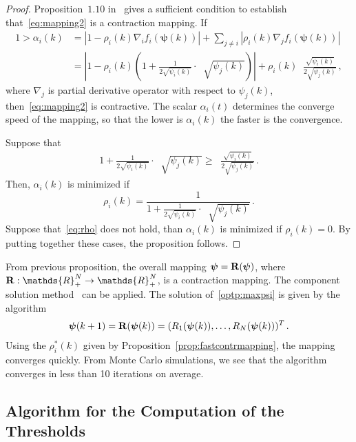 \documentclass[a4paper,notitlepage,onecolumn]{article}
\def\R{\mathds{R}}
\def\Rb{{\bf R}}
\def\Rb{{\bf R}}
\def\psib{\boldsymbol{\psi}}
\def\varphib{\boldsymbol{\varphi}}
\numberwithin{equation}{section}
\begin{document}
\begin{proof}
Proposition~$1.10$ in~\cite[Pag.193]{tsi} gives a sufficient
condition to establish that~\eqref{eq:mapping2} is a contraction
mapping. If
\begin{align*}
1 > \alpha_i(k)& =|1-\rho_i(k)\nabla_i f_i(\psib(k)) |+
\sum_{j\neq i} |
\rho_i(k) \nabla_j f_i(\psib(k))| \\
& = \left|1-\rho_i(k)\left(1 +  \frac{1}{2\sqrt{\psi_i(k)}} \cdot \mathop{\sum_{j\in \Theta_{\varphib_i}}}\sqrt{\psi_j(k)}\right) \right| + \rho_i(k)\mathop{\sum_{j\in \Theta_{\varphib_i}}}\frac{\sqrt{\psi_i(k)}}{2\sqrt{\psi_j(k)}}  \,,
\end{align*}
where $\nabla_j$ is partial derivative operator with respect to
$\psi_j(k)$, then~\eqref{eq:mapping2} is contractive. The scalar
$\alpha_i(t)$ determines the converge speed of the mapping, so
that the lower is $\alpha_i(k)$ the faster is the convergence.

Suppose that
\begin{align} \label{eq:rho}
1 +  \frac{1}{2\sqrt{\psi_i(k)}} \cdot \mathop{\sum_{j\in \Theta_{\varphib_i}}}\sqrt{\psi_j(k)} \geq \mathop{\sum_{j\in \Theta_{\varphib_i}}}\frac{\sqrt{\psi_i(k)}}{2\sqrt{\psi_j(k)}} \,.
\end{align}
Then, $\alpha_i(k)$ is minimized if
$$
\rho_i(k) = \frac{1}{1 + \frac{1}{2\sqrt{\psi_i(k)}} \cdot \mathop{\sum_{j\in \Theta_{\varphib_i}}}\sqrt{\psi_j(k)} }  \,.
$$
Suppose that~\eqref{eq:rho} does not hold, than $\alpha_i(k)$ is minimized if $\rho_i(k)=0$. By putting together these cases, the proposition follows.
\end{proof}
From previous proposition, the overall mapping $\psib=\Rb(\psib)$,
where $\Rb:\R^N_+\rightarrow \R^N_+$, is a contraction mapping. The component solution method~\cite[Pag.187]{tsi} can be applied.
The solution of~\eqref{optp:maxpsi} is given by the algorithm
\begin{align}
    \psib(k+1) = \Rb(\psib(k))=(R_1(\psib(k)),\dots,R_N(\psib(k)))^T \,.
    \label{eq:iterative_algo3}
\end{align}
Using the $\rho^*_i(k)$ given by Proposition~\ref{prop:fastcontrmapping}, the mapping converges quickly. From Monte Carlo simulations, we see that the algorithm converges in less than 10 iterations on average.



\subsection{Algorithm for the Computation of the Thresholds}
\end{document}
